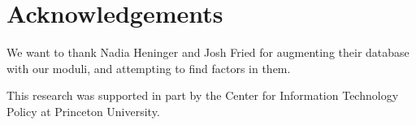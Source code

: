 \section*{Acknowledgements}
We want to thank Nadia Heninger and Josh Fried for augmenting their database
with our moduli, and attempting to find factors in them.

This research was supported in part by the Center for Information Technology
Policy at Princeton University.
